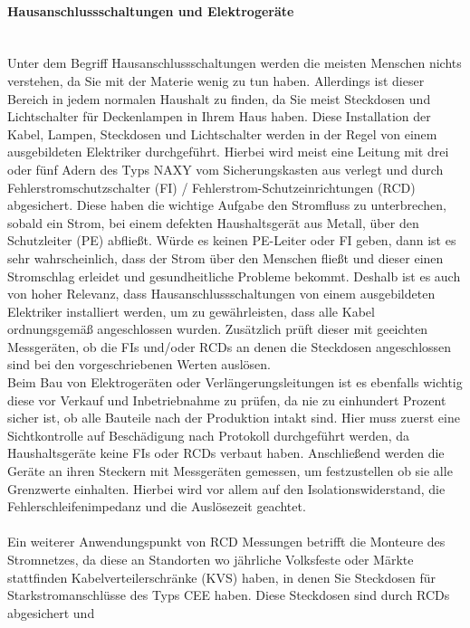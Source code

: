 \paragraph{Hausanschlussschaltungen und Elektrogeräte}\mbox{}\\
Unter dem Begriff Hausanschlussschaltungen werden die meisten Menschen nichts verstehen, da Sie mit der Materie wenig zu tun haben. Allerdings ist dieser 
Bereich in jedem normalen Haushalt zu finden, da Sie meist Steckdosen und Lichtschalter für Deckenlampen in Ihrem Haus haben. Diese Installation der Kabel, 
Lampen, Steckdosen und Lichtschalter werden in der Regel von einem ausgebildeten Elektriker durchgeführt. Hierbei wird meist eine Leitung mit drei oder fünf 
Adern des Typs NAXY vom Sicherungskasten aus verlegt und durch Fehlerstromschutzschalter (FI) / Fehlerstrom-Schutzeinrichtungen (RCD) abgesichert. Diese 
haben die wichtige Aufgabe den Stromfluss zu unterbrechen, sobald ein Strom, \zB bei einem defekten Haushaltsgerät aus Metall, über den Schutzleiter (PE) 
abfließt. Würde es keinen PE-Leiter oder FI geben, dann ist es sehr wahrscheinlich, dass der Strom über den Menschen fließt und dieser einen Stromschlag 
erleidet und gesundheitliche Probleme bekommt. Deshalb ist es auch von hoher Relevanz, dass Hausanschlussschaltungen von einem ausgebildeten Elektriker 
installiert werden, um zu gewährleisten, dass alle Kabel ordnungsgemäß angeschlossen wurden. Zusätzlich prüft dieser mit geeichten Messgeräten, ob die FIs 
und/oder RCDs an denen die Steckdosen angeschlossen sind bei den vorgeschriebenen Werten auslösen.\\
Beim Bau von Elektrogeräten oder Verlängerungsleitungen ist es ebenfalls wichtig diese vor Verkauf und Inbetriebnahme zu prüfen, da nie zu einhundert 
Prozent sicher ist, ob alle Bauteile nach der Produktion intakt sind. Hier muss zuerst eine Sichtkontrolle auf Beschädigung nach Protokoll durchgeführt 
werden, da Haushaltsgeräte keine FIs oder RCDs verbaut haben. Anschließend werden die Geräte an ihren Steckern mit Messgeräten gemessen, um festzustellen 
ob sie alle Grenzwerte einhalten. Hierbei wird vor allem auf den Isolationswiderstand, die Fehlerschleifenimpedanz und die Auslösezeit geachtet.\\\\
Ein weiterer Anwendungspunkt von RCD Messungen betrifft die Monteure des Stromnetzes, da diese an Standorten wo jährliche Volksfeste oder Märkte stattfinden 
Kabelverteilerschränke (KVS) haben, in denen Sie Steckdosen für Starkstromanschlüsse des Typs CEE haben. Diese Steckdosen sind durch RCDs abgesichert und 
